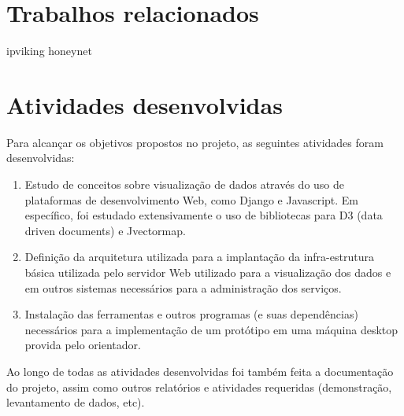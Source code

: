 \documentclass[%
        Portuguese,%
        ]
{ic-tese-v2}
\begin{document}
\chapter{Trabalhos relacionados}

ipviking
honeynet

\chapter{Atividades desenvolvidas}
Para alcançar os objetivos propostos no projeto, as seguintes atividades foram desenvolvidas:
\begin{enumerate}
\item Estudo de conceitos sobre visualização de dados através do uso de plataformas de desenvolvimento Web, como Django e Javascript. Em específico, foi estudado extensivamente o uso de bibliotecas para D3 (data driven documents) e Jvectormap.\\
\item Definição da arquitetura utilizada para a implantação da infra-estrutura básica utilizada pelo servidor Web utilizado para a visualização dos dados e em outros sistemas necessários para a administração dos serviços.\\
\item Instalação das ferramentas e outros programas (e suas dependências) necessários para a implementação de um protótipo em uma máquina desktop provida pelo orientador.\\
\end{enumerate}
Ao longo de todas as atividades desenvolvidas foi também feita a documentação do projeto, assim como outros relatórios e atividades requeridas (demonstração, levantamento de dados, etc).
\end{document}
